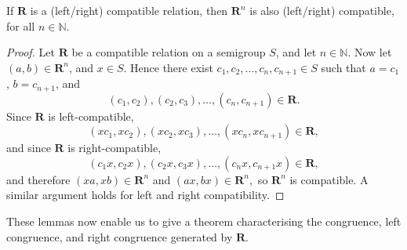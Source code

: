 \begin{lemma}
  \label{lem:compatn}
  If $\mathbf{R}$ is a (left/right) compatible relation, then $\mathbf{R}^n$ is
  also (left/right) compatible, for all $n \in \mathbb{N}$.
  \begin{proof}
    Let $\mathbf{R}$ be a compatible relation on a semigroup $S$,
    and let $n \in \mathbb{N}$.
    Now let $(a,b) \in \mathbf{R}^n$, and $x \in S$.  Hence there exist
    $c_1, c_2, \dots, c_n, c_{n+1} \in S$ such that $a=c_1$, $b=c_{n+1}$,
    and $$(c_1, c_2), (c_2, c_3), \dots, (c_n, c_{n+1}) \in \mathbf{R}.$$
    Since $\mathbf{R}$ is left-compatible,
    $$(xc_1, xc_2), (xc_2, xc_3), \dots, (xc_n, xc_{n+1}) \in \mathbf{R},$$
    and since $\mathbf{R}$ is right-compatible,
    $$(c_1x, c_2x), (c_2x, c_3x), \dots, (c_nx, c_{n+1}x) \in \mathbf{R},$$
    and therefore
    $(xa,xb) \in \mathbf{R}^n$ and $(ax, bx) \in \mathbf{R}^n,$
    so $\mathbf{R}^n$ is compatible. \cite[\S1.5]{howie}
    A similar argument holds for left and right compatibility.
  \end{proof}
\end{lemma}

These lemmas now enable us to give a theorem characterising the congruence, left
congruence, and right congruence generated by $\mathbf{R}$.

